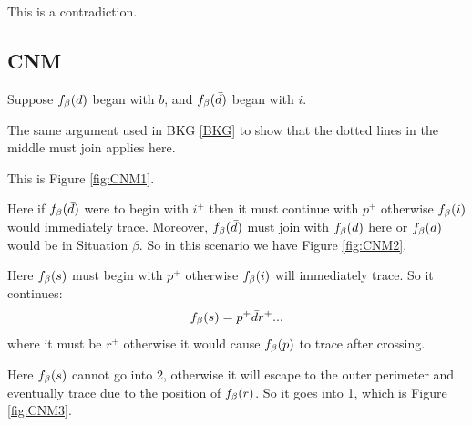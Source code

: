 







This is a contradiction.

\subsection{CNM}\label{CNM}
Suppose $f_\beta(d)$ began with $b$, and $f_\beta(\bar{d})$ began with $i$.

The same argument used in BKG \ref{BKG} to show that the dotted lines in the middle must join applies here.

This is Figure \ref{fig:CNM1}.

Here if $f_\beta(\bar{d})$ were to begin with $i^+$ then it must continue with $p^+$ otherwise $f_\beta(i)$ would immediately trace. Moreover, $f_\beta(\bar{d})$ must join with $f_\beta(d)$ here or $f_\beta(d)$ would be in Situation $\beta$. So in this scenario we have Figure \ref{fig:CNM2}.

Here $f_\beta(s)$ must begin with $p^+$ otherwise $f_\beta(i)$ will immediately trace. So it continues:
\[
f_\beta(s) = p^+ \bar{d} r^+...
\]
where it must be $r^+$ otherwise it would cause $f_\beta(p)$ to trace after crossing.

Here $f_\beta(s)$ cannot go into 2, otherwise it will escape to the outer perimeter and eventually trace due to the position of $f_\beta(r)$. So it goes into 1, which is Figure \ref{fig:CNM3}.

